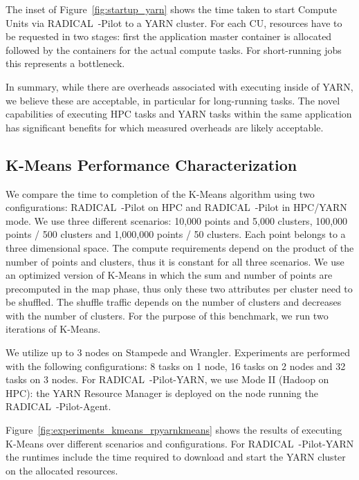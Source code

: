 The inset of Figure~\ref{fig:startup_yarn} shows the time taken to start Compute Units via RADICAL~-Pilot to a YARN cluster.
For each CU, resources have to be requested in two stages: first the application master container is allocated followed by the containers for the actual compute tasks.
For short-running jobs this represents a bottleneck.

In summary, while there are overheads associated with executing inside of YARN, we believe these are acceptable, in particular for long-running tasks.
The novel capabilities of executing HPC tasks and YARN tasks within the same application has significant benefits for which measured overheads are likely acceptable.

\subsection{K-Means Performance Characterization}
\label{ssec:kmeans}
We compare the time to completion of the K-Means algorithm using two configurations: RADICAL~-Pilot on HPC and RADICAL~-Pilot in HPC/YARN mode. 
We use three different scenarios: 10,000 points and 5,000 clusters, 100,000 points / 500 clusters and 1,000,000 points / 50 clusters.
Each point belongs to a three dimensional space.
The compute requirements depend on the product of the number of points and clusters, thus it is constant for all three scenarios.
We use an optimized version of K-Means in which the sum and number of points are precomputed in the map phase, thus only these two attributes per cluster need to be shuffled.
The shuffle traffic depends on the number of clusters and decreases with the number of clusters.
For the purpose of this benchmark, we run two iterations of K-Means.

We utilize up to 3 nodes on Stampede and Wrangler.
Experiments are performed with the following configurations: 8 tasks on 1 node, 16 tasks on 2 nodes and 32 tasks on 3 nodes.
For RADICAL~-Pilot-YARN, we use Mode II (Hadoop on HPC): the YARN Resource Manager is deployed on the node running the RADICAL~-Pilot-Agent.

Figure~\ref{fig:experiments_kmeans_rpyarnkmeans} shows the results of executing K-Means over different scenarios and configurations.
For RADICAL~-Pilot-YARN the runtimes include the time required to download and start the YARN cluster on the allocated resources.

